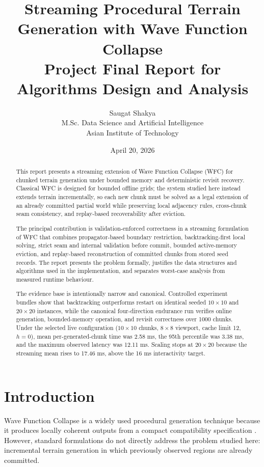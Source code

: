 \documentclass[12pt,a4paper]{report}
\title{\textbf{Streaming Procedural Terrain Generation with Wave Function Collapse}\\
\large Project Final Report for Algorithms Design and Analysis}
\author{Saugat Shakya\\
M.Sc. Data Science and Artificial Intelligence\\
Asian Institute of Technology}
\date{April 20, 2026}
\begin{document}
\hypersetup{pageanchor=false}
\maketitle
\tableofcontents
\clearpage

\begin{abstract}
This report presents a streaming extension of Wave Function Collapse (WFC) for chunked terrain generation under bounded memory and deterministic revisit recovery. Classical WFC is designed for bounded offline grids; the system studied here instead extends terrain incrementally, so each new chunk must be solved as a legal extension of an already committed partial world while preserving local adjacency rules, cross-chunk seam consistency, and replay-based recoverability after eviction.

The principal contribution is validation-enforced correctness in a streaming formulation of WFC that combines propagator-based boundary restriction, backtracking-first local solving, strict seam and internal validation before commit, bounded active-memory eviction, and replay-based reconstruction of committed chunks from stored seed records. The report presents the problem formally, justifies the data structures and algorithms used in the implementation, and separates worst-case analysis from measured runtime behaviour.

The evidence base is intentionally narrow and canonical. Controlled experiment bundles show that backtracking outperforms restart on identical seeded $10 \times 10$ and $20 \times 20$ instances, while the canonical four-direction endurance run verifies online generation, bounded-memory operation, and revisit correctness over 1000 chunks. Under the selected live configuration ($10 \times 10$ chunks, $8 \times 8$ viewport, cache limit 12, $h=0$), mean per-generated-chunk time was 2.58 ms, the 95th percentile was 3.38 ms, and the maximum observed latency was 12.11 ms. Scaling stops at $20 \times 20$ because the streaming mean rises to 17.46 ms, above the 16 ms interactivity target.
\end{abstract}
\clearpage
{}
\hypersetup{pageanchor=true}

\chapter{Introduction}
Wave Function Collapse is a widely used procedural generation technique because it produces locally coherent outputs from a compact compatibility specification \cite{karth2017wfcwild,karth2022wfc}. However, standard formulations do not directly address the problem studied here: incremental terrain generation in which previously observed regions are already committed.
\end{document}

